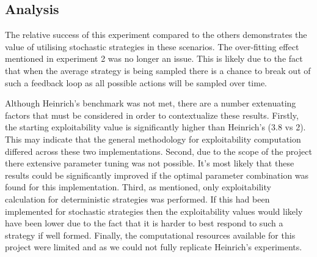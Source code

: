 \subsection{Analysis}\label{subsec:analysis3}
The relative success of this experiment compared to the others demonstrates the value of
utilising stochastic strategies in these scenarios.
The over-fitting effect mentioned in experiment 2 was no longer an issue.
This is likely due to the fact that when the average strategy is being sampled there is a
chance to break out of such a feedback loop as all possible actions will be sampled over time.

Although Heinrich's benchmark was not met, there are a number extenuating factors that must be
considered in order to contextualize these results.
Firstly, the starting exploitability value is significantly higher than Heinrich's (3.8 vs 2).
This may indicate that the general methodology for exploitability computation differed across these
two implementations.
Second, due to the scope of the project there extensive parameter tuning was not possible.
It's most likely that these results could be significantly improved if the optimal parameter
combination was found for this implementation.
Third, as mentioned, only exploitability calculation for deterministic strategies was performed.
If this had been implemented for stochastic strategies then the exploitability values would
likely have been lower due to the fact that it is harder to best respond to such a strategy if well formed.
Finally, the computational resources available for this project were limited and as we could not
fully replicate Heinrich's experiments.